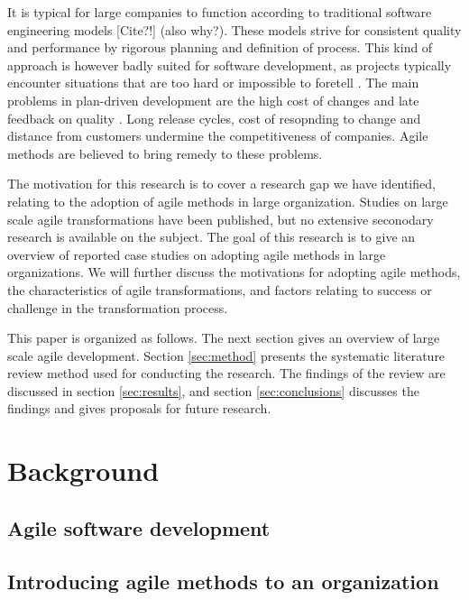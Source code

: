 \documentclass[lnbip]{svmultln}
\begin{document}
It is typical for large companies to function according to traditional software
engineering models [Cite?!] (also why?). These models strive for consistent quality and performance
by rigorous planning and definition of process. This kind of approach is however
badly suited for software development, as projects typically encounter
situations that are too hard or impossible to foretell \cite{Schwaber2002}.
The main problems in plan-driven development are the high cost of changes and
late feedback on quality \cite{Petersen2010}. Long release cycles, cost of
resopnding to change and distance from customers undermine the  competitiveness
of companies. Agile methods are believed to bring remedy to these problems.

The motivation for this research is to cover a research gap we have identified,
relating to the adoption of agile methods in large organization. Studies on
large scale agile transformations have been published, but no extensive
seconodary research is available on the subject. The goal of this research is to
give an overview of reported case studies on adopting agile methods in large
organizations. We will further discuss the motivations for adopting agile
methods, the characteristics of agile transformations, and factors relating to
success or challenge in the transformation process.

This paper is organized as follows. The next section gives an overview of large
scale agile development. Section \ref{sec:method} presents the systematic
literature review method used for conducting the research. The findings of the
review are discussed in section \ref{sec:results}, and section
\ref{sec:conclusions} discusses the findings and gives proposals for future
research.


\section{Background}
\label{sec:background}


\lipsum[1]

\subsection{Agile software development}

\lipsum[1]

\subsection{Introducing agile methods to an organization}
\end{document}
